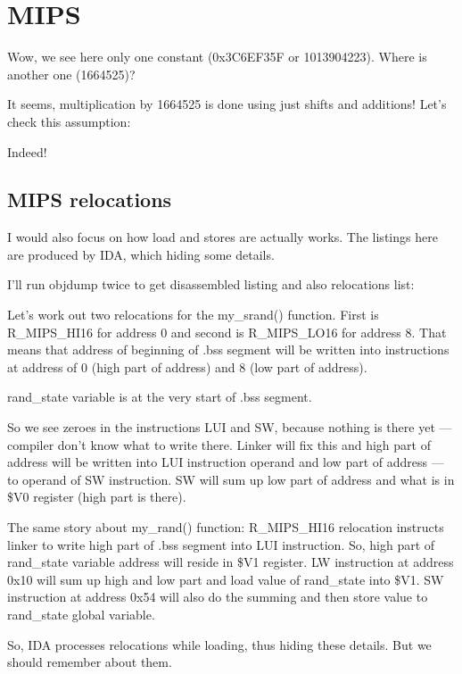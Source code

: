 \ifx\RUSSIAN\undefined
\section{MIPS}



Wow, we see here only one constant (0x3C6EF35F or 1013904223).
Where is another one (1664525)?

It seems, multiplication by 1664525 is done using just shifts and additions!
Let's check this assumption:





Indeed!

\subsection{MIPS relocations}

I would also focus on how load and stores are actually works. 
The listings here are produced by IDA, which hiding some details.

I'll run objdump twice to get disassembled listing and also relocations list:



Let's work out two relocations for the my\_srand() function.
First is R\_MIPS\_HI16 for address 0 and second is R\_MIPS\_LO16 for address 8.
That means that address of beginning of .bss segment will be written into instructions at
address of 0 (high part of address) and 8 (low part of address).

rand\_state variable is at the very start of .bss segment.

So we see zeroes in the instructions LUI and SW, because nothing is there yet --- compiler don't know what
to write there.
Linker will fix this and high part of address will be written into LUI instruction operand and
low part of address --- to operand of SW instruction. 
SW will sum up low part of address and what is in \$V0 register (high part is there).

The same story about my\_rand() function: R\_MIPS\_HI16 relocation instructs linker to write high part
of .bss segment into LUI instruction.
So, high part of rand\_state variable address will reside in \$V1 register.
LW instruction at address 0x10 will sum up high and low part and load value of rand\_state into \$V1.
SW instruction at address 0x54 will also do the summing and then store value to rand\_state global variable.

So, IDA processes relocations while loading, thus hiding these details.
But we should remember about them.

\fi
